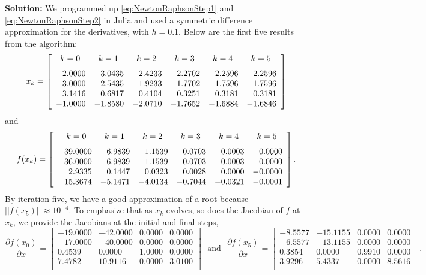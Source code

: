 \textbf{Solution:} We programmed up \eqref{eq:NewtonRaphsonStep1} and \eqref{eq:NewtonRaphsonStep2} in Julia and used a symmetric difference approximation for the derivatives, with $h=0.1$. Below are the first five results from the algorithm:
$$
x_k = \left[
\begin{array}{rrrrrr}
k=0~~ & k=1~~ & k=2 ~~& k=3~~ & k=4~~& k=5~~ \medskip \\
-2.0000 & -3.0435 & -2.4233 & -2.2702 & -2.2596 & -2.2596 \\
3.0000 & 2.5435 & 1.9233 & 1.7702 & 1.7596 & 1.7596 \\
3.1416 & 0.6817 & 0.4104 & 0.3251 & 0.3181 & 0.3181 \\
-1.0000 & -1.8580 & -2.0710 & -1.7652 & -1.6884 & -1.6846 
\end{array}
\right]
$$
and
$$
f(x_k) = 
\left[
\begin{array}{rrrrrr}
k=0~~ & k=1~~ & k=2 ~~& k=3~~ & k=4~~& k=5~~ \medskip\\
-39.0000 & -6.9839 & -1.1539 & -0.0703 & -0.0003 & -0.0000 \\
-36.0000 & -6.9839 & -1.1539 & -0.0703 & -0.0003 & -0.0000 \\
2.9335 & 0.1447 & 0.0323 & 0.0028 & 0.0000 & -0.0000 \\
15.3674 & -5.1471 & -4.0134 & -0.7044 & -0.0321 & -0.0001
\end{array}
\right].
$$
By iteration five, we have a good approximation of a root because $||f(x_5)|| \approx 10^{-4}$.
To emphasize that as $x_k$ evolves, so does the Jacobian of $f$ at $x_k$, we provide the Jacobians at the initial and final steps,
$$
 \frac{\partial f(x_0)}{\partial x}=\left[
\begin{array}{rrrr}
-19.0000 & -42.0000 & 0.0000 & 0.0000 \\
-17.0000 & -40.0000 & 0.0000 & 0.0000 \\
0.4539 & 0.0000 & 1.0000 & 0.0000 \\
7.4782 & 10.9116 & 0.0000 & 3.0100 \\
\end{array}
\right] \text{~~and~~}  \frac{\partial f(x_5)}{\partial x} = 
\left[
\begin{array}{rrrr}
-8.5577 & -15.1155 & 0.0000 & 0.0000 \\
-6.5577 & -13.1155 & 0.0000 & 0.0000 \\
0.3854 & 0.0000 & 0.9910 & 0.0000 \\
3.9296 & 5.4337 & 0.0000 & 8.5616 \\
\end{array}
\right].
$$

